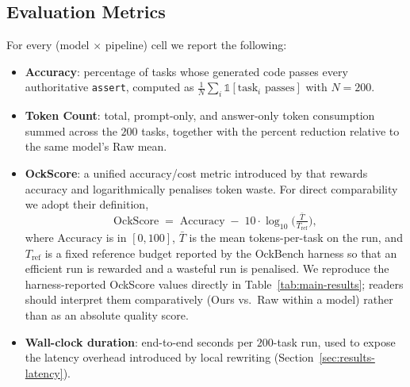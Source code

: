 \documentclass[11pt,a4paper,twocolumn]{article}
\begin{document}
\subsection{Evaluation Metrics}
\label{sec:metrics}
For every (model $\times$ pipeline) cell we report the following:
\begin{itemize}
    \item \textbf{Accuracy}: percentage of tasks whose generated code passes every authoritative \texttt{assert}, computed as $\frac{1}{N}\sum_i \mathbb{1}[\text{task}_i \text{ passes}]$ with $N = 200$.
    \item \textbf{Token Count}: total, prompt-only, and answer-only token consumption summed across the $200$ tasks, together with the percent reduction relative to the same model's Raw mean.
    \item \textbf{OckScore}: a unified accuracy/cost metric introduced by \cite{du2026ockbench} that rewards accuracy and logarithmically penalises token waste. For direct comparability we adopt their definition,
    \begin{equation}
        \mathrm{OckScore} \;=\; \mathrm{Accuracy} \;-\; 10\cdot\log_{10}\!\Big(\tfrac{\bar{T}}{T_{\text{ref}}}\Big),
        \label{eq:ockscore}
    \end{equation}
    where $\mathrm{Accuracy}$ is in $[0, 100]$, $\bar{T}$ is the mean tokens-per-task on the run, and $T_{\text{ref}}$ is a fixed reference budget reported by the OckBench harness so that an efficient run is rewarded and a wasteful run is penalised. We reproduce the harness-reported OckScore values directly in Table~\ref{tab:main-results}; readers should interpret them comparatively (Ours vs.\ Raw within a model) rather than as an absolute quality score.
    \item \textbf{Wall-clock duration}: end-to-end seconds per $200$-task run, used to expose the latency overhead introduced by local rewriting (Section~\ref{sec:results-latency}).
\end{itemize}
\end{document}
